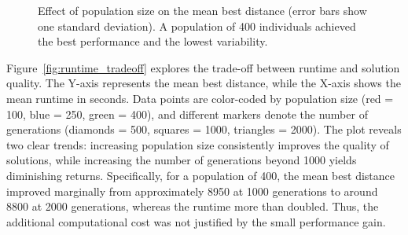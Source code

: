 \documentclass{scrartcl}
\begin{document}
\begin{figure}[H]
  \centering
  \caption{Effect of population size on the mean best distance (error bars show one standard deviation). A population of 400 individuals achieved the best performance and the lowest variability.}
  \label{fig:population_size}
\end{figure}




Figure~\ref{fig:runtime_tradeoff} explores the trade-off between runtime and solution quality.  
The Y-axis represents the mean best distance, while the X-axis shows the mean runtime in seconds.  
Data points are color-coded by population size (red = 100, blue = 250, green = 400), and different markers denote the number of generations (diamonds = 500, squares = 1000, triangles = 2000).  
The plot reveals two clear trends: increasing population size consistently improves the quality of solutions, while increasing the number of generations beyond 1000 yields diminishing returns.  
Specifically, for a population of 400, the mean best distance improved marginally from approximately 8950 at 1000 generations to around 8800 at 2000 generations, whereas the runtime more than doubled.  
Thus, the additional computational cost was not justified by the small performance gain.
\end{document}
